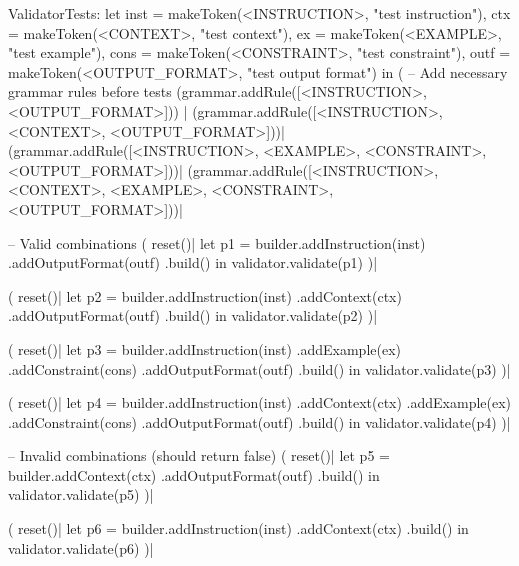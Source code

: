 \documentclass[a4paper]{article}
\begin{document}
\begin{vdm_al}
    ValidatorTests:
    let inst = makeToken(<INSTRUCTION>, "test instruction"),
        ctx = makeToken(<CONTEXT>, "test context"),
        ex = makeToken(<EXAMPLE>, "test example"),
        cons = makeToken(<CONSTRAINT>, "test constraint"),
        outf = makeToken(<OUTPUT_FORMAT>, "test output format") in
    (
        -- Add necessary grammar rules before tests
        (grammar.addRule([<INSTRUCTION>, <OUTPUT_FORMAT>])) |
        (grammar.addRule([<INSTRUCTION>, <CONTEXT>, <OUTPUT_FORMAT>]))|
        (grammar.addRule([<INSTRUCTION>, <EXAMPLE>, <CONSTRAINT>, <OUTPUT_FORMAT>]))|
        (grammar.addRule([<INSTRUCTION>, <CONTEXT>, <EXAMPLE>, <CONSTRAINT>, <OUTPUT_FORMAT>]))|

        -- Valid combinations
        (
            reset()|
            let p1 = builder.addInstruction(inst)
                            .addOutputFormat(outf)
                            .build() in
            validator.validate(p1)
        )|

        (
            reset()|
            let p2 = builder.addInstruction(inst)
                            .addContext(ctx)
                            .addOutputFormat(outf)
                            .build() in
            validator.validate(p2)
        )|

        (
            reset()|
            let p3 = builder.addInstruction(inst)
                            .addExample(ex)
                            .addConstraint(cons)
                            .addOutputFormat(outf)
                            .build() in
            validator.validate(p3)
        )|

        (
            reset()|
            let p4 = builder.addInstruction(inst)
                            .addContext(ctx)
                            .addExample(ex)
                            .addConstraint(cons)
                            .addOutputFormat(outf)
                            .build() in
            validator.validate(p4)
        )|

        -- Invalid combinations (should return false)
        (
            reset()|
            let p5 = builder.addContext(ctx)
                            .addOutputFormat(outf)
                            .build() in
            validator.validate(p5)
        )|

        (
            reset()|
            let p6 = builder.addInstruction(inst)
                            .addContext(ctx)
                            .build() in
            validator.validate(p6)
        )|


\end{vdm_al}
\end{document}
